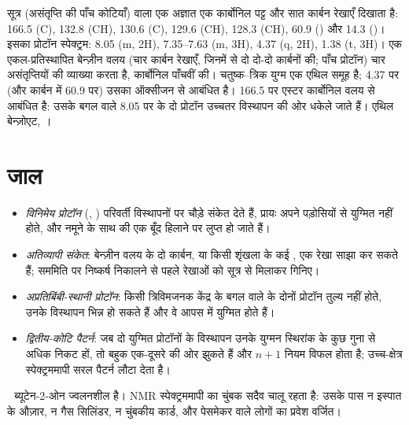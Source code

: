 \begin{example}[एक ऐरोमैटिक एस्टर, C$_9$H$_{10}$O$_2$]\label{ex:b2:structure-determination:ester}
सूत्र  (असंतृप्ति की पाँच कोटियाँ) वाला एक अज्ञात एक कार्बोनिल पट्ट और सात
कार्बन रेखाएँ दिखाता है: 166.5 (C), 132.8 (CH), 130.6 (C), 129.6 (CH), 128.3 (CH), 60.9 () और 14.3
()। इसका प्रोटॉन स्पेक्ट्रम: 8.05 (m, 2H), 7.35--7.63 (m, 3H), 4.37 (q, 2H), 1.38 (t, 3H)। एक
एकल-प्रतिस्थापित बेन्ज़ीन वलय (चार  कार्बन रेखाएँ, जिनमें से दो दो-दो कार्बनों की; पाँच
 प्रोटॉन) चार असंतृप्तियों की व्याख्या करता है, कार्बोनिल पाँचवीं की। चतुष्क--त्रिक युग्म
एक एथिल समूह है; 4.37 पर (और कार्बन में 60.9 पर) उसका  ऑक्सीजन से आबंधित है। 166.5 पर एस्टर कार्बोनिल
वलय से आबंधित है: उसके बगल वाले 8.05 पर के दो प्रोटॉन उच्चतर विस्थापन की ओर धकेले जाते हैं। एथिल
बेन्ज़ोएट, ।
\end{example}

\section{जाल}

\begin{itemize}
  \item \emph{विनिमेय प्रोटॉन} (, ) परिवर्ती विस्थापनों पर चौड़े संकेत देते हैं,
        प्रायः अपने पड़ोसियों से युग्मित नहीं होते, और नमूने के साथ  की एक बूँद हिलाने पर
        लुप्त हो जाते हैं।
  \item \emph{अतिव्यापी संकेत}: बेन्ज़ीन वलय के दो कार्बन, या किसी शृंखला के कई ,
        एक रेखा साझा कर सकते हैं; सममिति पर निष्कर्ष निकालने से पहले रेखाओं को सूत्र से मिलाकर गिनिए।
  \item \emph{अप्रतिबिंबी-स्थानी प्रोटॉन}: किसी त्रिविमजनक केंद्र के बगल वाले  के दोनों प्रोटॉन
        तुल्य नहीं होते, उनके विस्थापन भिन्न हो सकते हैं और वे आपस में युग्मित होते हैं।
  \item \emph{द्वितीय-कोटि पैटर्न}: जब दो युग्मित प्रोटॉनों के विस्थापन उनके युग्मन स्थिरांक के
        कुछ गुना से अधिक निकट हों, तो बहुक एक-दूसरे की ओर झुकते हैं और $n+1$ नियम विफल होता है;
        उच्च-क्षेत्र स्पेक्ट्रममापी सरल पैटर्न लौटा देता है।
\end{itemize}

\begin{safety}{\,\,}
ब्यूटेन-2-ओन ज्वलनशील है। NMR स्पेक्ट्रममापी का चुंबक सदैव चालू रहता है: उसके पास न इस्पात के औज़ार, न गैस
सिलिंडर, न चुंबकीय कार्ड, और पेसमेकर वाले लोगों का प्रवेश वर्जित।
\end{safety}

